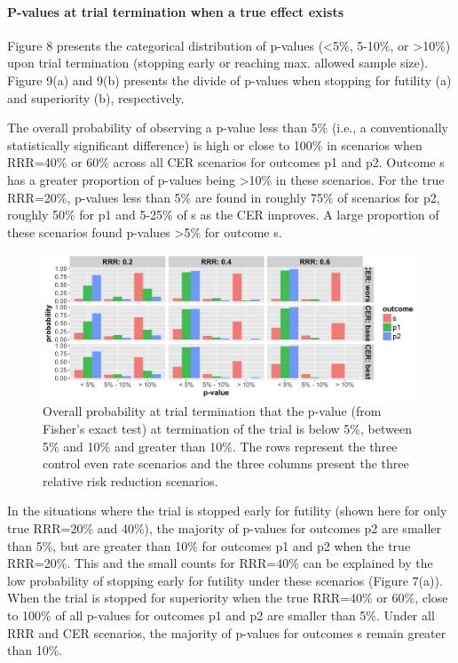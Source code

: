 \documentclass[]{article}
\let\oldparagraph\paragraph
\renewcommand{\paragraph}[1]{\oldparagraph{#1}\mbox{}}
\begin{document}
\hypertarget{p-values-at-trial-termination-when-a-true-effect-exists}{%
\paragraph{P-values at trial termination when a true effect
exists}\label{p-values-at-trial-termination-when-a-true-effect-exists}}

Figure 8 presents the categorical distribution of p-values
(\textless{}5\%, 5-10\%, or \textgreater{}10\%) upon trial termination
(stopping early or reaching max. allowed sample size). Figure 9(a) and
9(b) presents the divide of p-values when stopping for futility (a) and
superiority (b), respectively.

The overall probability of observing a p-value less than 5\% (i.e., a
conventionally statistically significant difference) is high or close to
100\% in scenarios when RRR=40\% or 60\% across all CER scenarios for
outcomes p1 and p2. Outcome s has a greater proportion of p-values being
\textgreater{}10\% in these scenarios. For the true RRR=20\%, p-values
less than 5\% are found in roughly 75\% of scenarios for p2, roughly
50\% for p1 and 5-25\% of s as the CER improves. A large proportion of
these scenarios found p-values \textgreater{}5\% for outcome s.

\begin{figure}
  \caption{Overall probability at trial termination that the p-value (from Fisher’s exact test) at termination of the
  trial is below 5\%, between 5\% and 10\% and greater than 10\%. The rows represent the three control even rate scenarios
  and the three columns present the three relative risk reduction scenarios.}
  \includegraphics{../plots/stop_p1_new/pvalue_sim_05_stopp1_new.png}
\end{figure}

In the situations where the trial is stopped early for futility (shown
here for only true RRR=20\% and 40\%), the majority of p-values for
outcomes p2 are smaller than 5\%, but are greater than 10\% for outcomes
p1 and p2 when the true RRR=20\%. This and the small counts for RRR=40\%
can be explained by the low probability of stopping early for futility
under these scenarios (Figure 7(a)). When the trial is stopped for
superiority when the true RRR=40\% or 60\%, close to 100\% of all
p-values for outcomes p1 and p2 are smaller than 5\%. Under all RRR and
CER scenarios, the majority of p-values for outcomes s remain greater
than 10\%.
\end{document}
